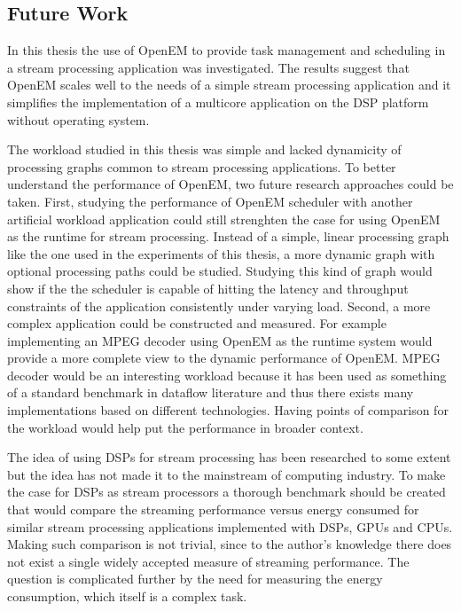 \subsection{Future Work}
\label{subsec:future-work}
In this thesis the use of OpenEM to provide task management and scheduling in a stream processing application was investigated. The results suggest that OpenEM scales well to the needs of a simple stream processing application and it simplifies the implementation of a multicore application on the DSP platform without operating system.

The workload studied in this thesis was simple and lacked dynamicity of processing graphs common to stream processing applications. To better understand the performance of OpenEM, two future research approaches could be taken. First, studying the performance of OpenEM scheduler with another artificial workload application could still strenghten the case for using OpenEM as the runtime for stream processing. Instead of a simple, linear processing graph like the one used in the experiments of this thesis, a more dynamic graph with optional processing paths could be studied. Studying this kind of graph would show if the the scheduler is capable of hitting the latency and throughput constraints of the application consistently under varying load. Second, a more complex application could be constructed and measured. For example implementing an MPEG decoder using OpenEM as the runtime system would provide a more complete view to the dynamic performance of OpenEM. MPEG decoder would be an interesting workload because it has been used as something of a standard benchmark in dataflow literature and thus there exists many implementations based on different technologies. Having points of comparison for the workload would help put the performance in broader context.

The idea of using DSPs for stream processing has been researched to some extent but the idea has not made it to the mainstream of computing industry. To make the case for DSPs as stream processors a thorough benchmark should be created that would compare the streaming performance versus energy consumed for similar stream processing applications implemented with DSPs, GPUs and CPUs. Making such comparison is not trivial, since to the author's knowledge there does not exist a single widely accepted measure of streaming performance. The question is complicated further by the need for measuring the energy consumption, which itself is a complex task.

